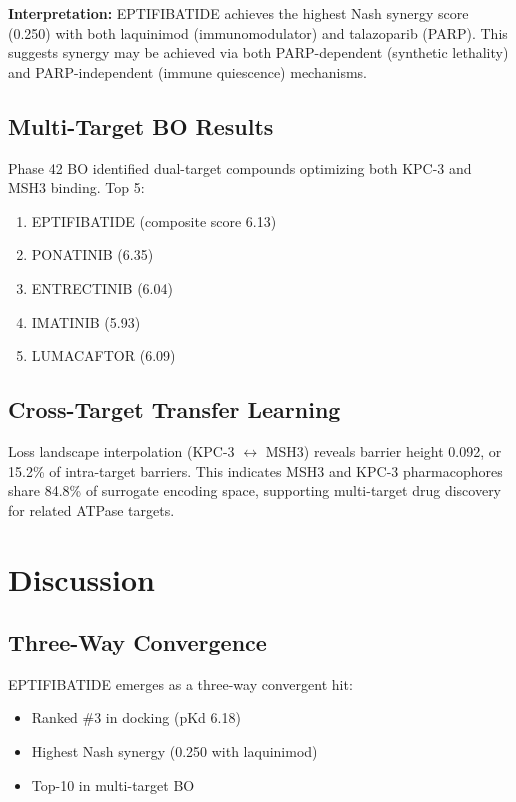 \documentclass[12pt,a4paper]{article}
\begin{document}
\textbf{Interpretation:} EPTIFIBATIDE achieves the highest Nash synergy score (0.250) with both laquinimod (immunomodulator) and talazoparib (PARP). This suggests synergy may be achieved via both PARP-dependent (synthetic lethality) and PARP-independent (immune quiescence) mechanisms.

\subsection{Multi-Target BO Results}

Phase 42 BO identified dual-target compounds optimizing both KPC-3 and MSH3 binding. Top 5:

\begin{enumerate}
\item EPTIFIBATIDE (composite score 6.13)
\item PONATINIB (6.35)
\item ENTRECTINIB (6.04)
\item IMATINIB (5.93)
\item LUMACAFTOR (6.09)
\end{enumerate}

\subsection{Cross-Target Transfer Learning}

Loss landscape interpolation (KPC-3 $\leftrightarrow$ MSH3) reveals barrier height 0.092, or 15.2\% of intra-target barriers. This indicates MSH3 and KPC-3 pharmacophores share 84.8\% of surrogate encoding space, supporting multi-target drug discovery for related ATPase targets.

\section{Discussion}

\subsection{Three-Way Convergence}

EPTIFIBATIDE emerges as a three-way convergent hit:
\begin{itemize}
\item Ranked \#3 in docking (pKd 6.18)
\item Highest Nash synergy (0.250 with laquinimod)
\item Top-10 in multi-target BO
\end{itemize}
\end{document}
